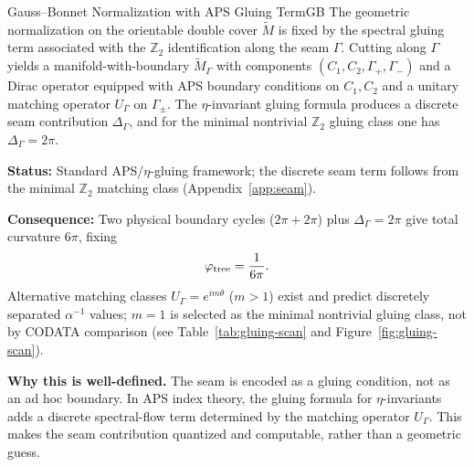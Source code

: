 \begin{axiom}{Gauss--Bonnet Normalization with APS Gluing Term}{GB}
The geometric normalization on the orientable double cover $\widetilde{M}$ is fixed by the
spectral gluing term associated with the $\mathbb{Z}_2$ identification along the seam $\Gamma$.
Cutting along $\Gamma$ yields a manifold-with-boundary $\widetilde{M}_\Gamma$ with components
$(C_1,C_2,\Gamma_+,\Gamma_-)$ and a Dirac operator equipped with APS boundary conditions on
$C_1,C_2$ and a unitary matching operator $U_\Gamma$ on $\Gamma_\pm$. The $\eta$-invariant gluing
formula produces a discrete seam contribution $\Delta_\Gamma$, and for the minimal nontrivial
$\mathbb{Z}_2$ gluing class one has $\Delta_\Gamma = 2\pi$.

\tcblower
\textbf{Status:} Standard APS/$\eta$-gluing framework; the discrete seam term follows from the
minimal $\mathbb{Z}_2$ matching class (Appendix~\ref{app:seam}).

\textbf{Consequence:} Two physical boundary cycles ($2\pi+2\pi$) plus $\Delta_\Gamma=2\pi$ give
total curvature $6\pi$, fixing
\begin{equation}
    \varphi_{\mathrm{tree}} = \frac{1}{6\pi}.
\end{equation}
Alternative matching classes $U_\Gamma=e^{im\theta}$ ($m>1$) exist and predict
discretely separated $\alpha^{-1}$ values; $m=1$ is selected as the minimal
nontrivial gluing class, not by CODATA comparison
(see Table~\ref{tab:gluing-scan} and Figure~\ref{fig:gluing-scan}).
\end{axiom}

\noindent\textbf{Why this is well-defined.} The seam is encoded as a gluing condition, not as an
ad hoc boundary. In APS index theory, the gluing formula for $\eta$-invariants adds a discrete
spectral-flow term determined by the matching operator $U_\Gamma$. This makes the seam
contribution quantized and computable, rather than a geometric guess.

